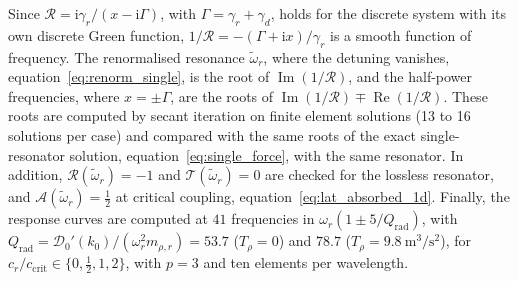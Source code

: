 {Since $\mathcal{R}=\mathrm{i}\gamma_r/(x-\mathrm{i}\Gamma)$, with $\Gamma=\gamma_r+\gamma_d$, holds for the discrete system with its own discrete Green function, $1/\mathcal{R}=-(\Gamma+\mathrm{i}x)/\gamma_r$ is a smooth function of frequency. The renormalised resonance $\widetilde{\omega}_r$, where the detuning vanishes, equation~\eqref{eq:renorm_single}, is the root of $\operatorname{Im}(1/\mathcal{R})$, and the half-power frequencies, where $x=\pm\Gamma$, are the roots of $\operatorname{Im}(1/\mathcal{R})\mp\operatorname{Re}(1/\mathcal{R})$. These roots are computed by secant iteration on finite element solutions (13 to 16 solutions per case) and compared with the same roots of the exact single-resonator solution, equation~\eqref{eq:single_force}, with the same resonator. In addition, $\mathcal{R}(\widetilde{\omega}_r)=-1$ and $\mathcal{T}(\widetilde{\omega}_r)=0$ are checked for the lossless resonator, and $\mathcal{A}(\widetilde{\omega}_r)=\tfrac12$ at critical coupling, equation~\eqref{eq:lat_absorbed_1d}. Finally, the response curves are computed at $41$ frequencies in $\omega_r(1\pm5/Q_\mathrm{rad})$, with $Q_\mathrm{rad}=\mathcal{D}_0'(k_0)/(\omega_r^2m_{\rho,r})=53.7$ ($T_\rho=0$) and $78.7$ ($T_\rho=9.8~\si{\meter\cubed\per\second\squared}$), for $c_r/c_\mathrm{crit}\in\{0,\tfrac12,1,2\}$, with $p=3$ and ten elements per wavelength.

}
